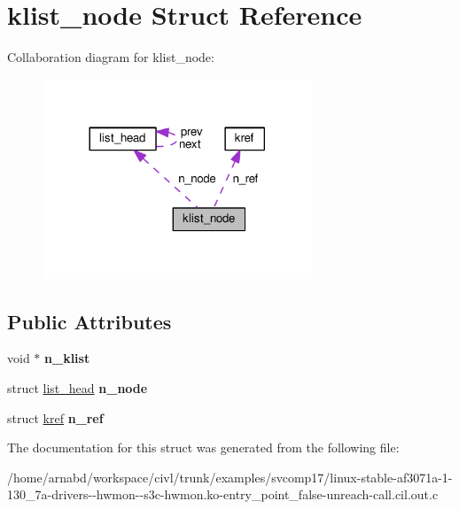 \hypertarget{structklist__node}{}\section{klist\+\_\+node Struct Reference}
\label{structklist__node}


Collaboration diagram for klist\+\_\+node\+:
\nopagebreak
\begin{figure}[H]
\begin{center}
\leavevmode
\includegraphics[width=228pt]{structklist__node__coll__graph}
\end{center}
\end{figure}
\subsection*{Public Attributes}
\begin{DoxyCompactItemize}
\item 
\hypertarget{structklist__node_aaf677b620eef42444ebf5a82489acc73}{}void $\ast$ {\bfseries n\+\_\+klist}\label{structklist__node_aaf677b620eef42444ebf5a82489acc73}

\item 
\hypertarget{structklist__node_ad1a5a4aad076dab8c5b8d994eae96184}{}struct \hyperlink{structlist__head}{list\+\_\+head} {\bfseries n\+\_\+node}\label{structklist__node_ad1a5a4aad076dab8c5b8d994eae96184}

\item 
\hypertarget{structklist__node_ab4e84d4ccebd6e5c73a89609aa2744c7}{}struct \hyperlink{structkref}{kref} {\bfseries n\+\_\+ref}\label{structklist__node_ab4e84d4ccebd6e5c73a89609aa2744c7}

\end{DoxyCompactItemize}


The documentation for this struct was generated from the following file\+:\begin{DoxyCompactItemize}
\item 
/home/arnabd/workspace/civl/trunk/examples/svcomp17/linux-\/stable-\/af3071a-\/1-\/130\+\_\+7a-\/drivers-\/-\/hwmon-\/-\/s3c-\/hwmon.\+ko-\/entry\+\_\+point\+\_\+false-\/unreach-\/call.\+cil.\+out.\+c\end{DoxyCompactItemize}

